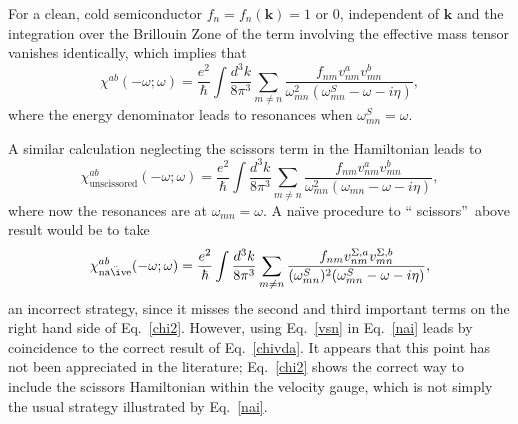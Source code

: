 \documentclass[floatfix,prb,aps,superscriptaddress,11pt]{revtex4}
\begin{document}
For a clean, cold semiconductor $f_n=f_n(\mathbf{k})=1$ or 0, independent of
$\mathbf{k}$ and the integration over the Brillouin Zone of
the term involving the effective mass tensor vanishes identically,
\cite{ghahramaniPRB91} which implies that 
\begin{equation}\label{chivda} 
\chi ^{ab}(-\omega;\omega)=\frac{e^{2}}{\hbar }\int \frac{d^{3}k}{8\pi ^{3}}
\sum_{m\ne n}\frac{f_{nm}v_{nm}^{a}v_{mn}^{b}}{\omega_{mn}^{2}(\omega_{mn}^{S}-\omega
-i\eta )}
,
\end{equation}
where the energy denominator leads to
resonances when $\omega_{mn}^{S}=\omega$.

A similar calculation neglecting the scissors term in the Hamiltonian leads
to 
\begin{equation*}
\chi _{\mathrm{unscissored}}^{ab}(-\omega;\omega)=\frac{e^{2}}{\hbar }\int \frac{
d^{3}k}{8\pi ^{3}}\sum_{m\ne n}\frac{f_{nm}v_{nm}^{a}v_{mn}^{b}}{\omega_{mn}^{2}(\omega
_{mn}-\omega-i\eta )},
\end{equation*}
where now the resonances are at $\omega
_{mn}=\omega$. 
A na\"{\i}ve procedure to \textquotedblleft
scissors\textquotedblright\ above result would be to take 
\begin{equation}
\label{nai}
\chi _{\mathrm{na\ddot{\i}ve}}^{ab}(-\omega;\omega)=\frac{e^{2}}{\hbar }\int \frac{d^{3}k}{
8\pi ^{3}}\sum_{m\ne n}\frac{f_{nm}v_{nm}^{\Sigma,a}v_{mn}^{\Sigma,b}}{(\omega
_{mn}^{S})^{2}(\omega_{mn}^{S}-\omega-i\eta )},
\end{equation}
an incorrect strategy, since it misses the second and third important terms
on the right hand side of Eq.~\eqref{chi2}. However, using Eq.~\eqref{vsn}
in Eq.~\eqref{nai} leads by coincidence to the correct result 
of Eq.~\eqref{chivda}.
It appears that this point has not been appreciated in the literature; 
Eq.~\eqref{chi2} shows the correct way to include the scissors Hamiltonian
within the velocity gauge, which is not simply the usual strategy
illustrated by Eq.~\eqref{nai}.\cite{last}
\end{document}
